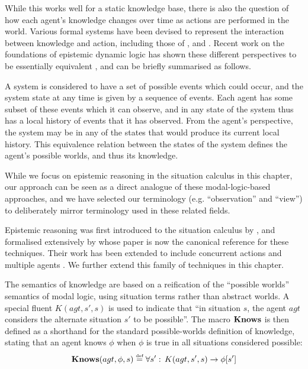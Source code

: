 While this works well for a static knowledge base, there is also the
question of how each agent's knowledge changes over time as actions
are performed in the world. Various formal systems have been devised
to represent the interaction between knowledge and action, including
those of \citep{fagin95}, \citep{parikh85dist_knowledge} and \citep{baltag98pa_ck}.
Recent work on the foundations of epistemic dynamic logic has shown
these different perspectives to be essentially equivalent \citep{vanBentham06tree_of_knowledge,pacuit07history_structures},
and can be briefly summarised as follows.

A system is considered to have a set of possible events which could
occur, and the system state at any time is given by a sequence of
events. Each agent has some subset of these events which it can observe,
and in any state of the system thus has a local history of events
that it has observed. From the agent's perspective, the system may
be in any of the states that would produce its current local history.
This equivalence relation between the states of the system defines
the agent's possible worlds, and thus its knowledge.

While we focus on epistemic reasoning in the situation calculus in
this chapter, our approach can be seen as a direct analogue of these
modal-logic-based approaches, and we have selected our terminology
(e.g. {}``observation'' and {}``view'') to deliberately mirror
terminology used in these related fields.

Epistemic reasoning was first introduced to the situation calculus
by \citet{moore80know_act}, and formalised extensively by \citet{scherl03sc_knowledge}
whose paper is now the canonical reference for these techniques. Their
work has been extended to include concurrent actions \citep{scherl03conc_knowledge}
and multiple agents \citep{shapiro98specifying_ma_systems}. We further
extend this family of techniques in this chapter.

The semantics of knowledge are based on a reification of the {}``possible
worlds'' semantics of modal logic, using situation terms rather than
abstract worlds. A special fluent $K(agt,s',s)$ is used to indicate
that {}``in situation $s$, the agent $agt$ considers the alternate
situation $s'$ to be possible''. The macro $\mathbf{Knows}$ is then defined
as a shorthand for the standard possible-worlds definition of knowledge,
stating that an agent knows $\phi$ when $\phi$ is true in all situations
considered possible: \begin{equation}
\mathbf{Knows}(agt,\phi,s)\stackrel{\mbox{\tiny def}}{=}\forall s':\, K(agt,s',s)\rightarrow\phi[s']\label{eqn:Knowledge:knows_def}\end{equation}



